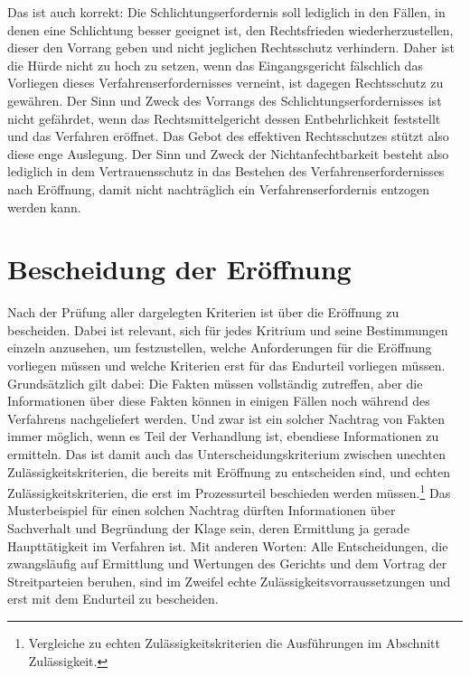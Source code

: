 Das ist auch korrekt:
Die Schlichtungserfordernis soll lediglich in den Fällen, in denen eine Schlichtung besser geeignet ist, den Rechtsfrieden wiederherzustellen, dieser den Vorrang geben und nicht jeglichen Rechtsschutz verhindern.
Daher ist die Hürde nicht zu hoch zu setzen, wenn das Eingangsgericht fälschlich das Vorliegen dieses Verfahrenserfordernisses verneint, ist dagegen Rechtsschutz zu gewähren.
Der Sinn und Zweck des Vorrangs des Schlichtungserfordernisses ist nicht gefährdet, wenn das Rechtsmittelgericht dessen Entbehrlichkeit feststellt und das Verfahren eröffnet.
Das Gebot des effektiven Rechtsschutzes stützt also diese enge Auslegung. Der Sinn und Zweck der Nichtanfechtbarkeit besteht also lediglich in dem Vertrauensschutz in das Bestehen des Verfahrenserfordernisses nach Eröffnung, damit nicht nachträglich ein Verfahrenserfordernis entzogen werden kann.

\section{Bescheidung der Eröffnung}
\label{Anrufung:Beschluss}
Nach der Prüfung aller dargelegten Kriterien ist über die Eröffnung zu bescheiden.
Dabei ist relevant, sich für jedes Kritrium und seine Bestimmungen einzeln anzusehen, um festzustellen, welche Anforderungen für die Eröffnung vorliegen müssen und welche Kriterien erst für das Endurteil vorliegen müssen.
Grundsätzlich gilt dabei:
Die Fakten müssen vollständig zutreffen, aber die Informationen über diese Fakten können in einigen Fällen noch während des Verfahrens nachgeliefert werden.
Und zwar ist ein solcher Nachtrag von Fakten immer möglich, wenn es Teil der Verhandlung ist, ebendiese Informationen zu ermitteln.
Das ist damit auch das Unterscheidungskriterium zwischen unechten Zulässigkeitskriterien, die bereits mit Eröffnung zu entscheiden sind, und echten Zulässigkeitskriterien, die erst im Prozessurteil beschieden werden müssen.\footnote{Vergleiche zu echten Zulässigkeitskriterien die Ausführungen im Abschnitt Zulässigkeit.}
Das Musterbeispiel für einen solchen Nachtrag dürften Informationen über Sachverhalt und Begründung der Klage sein, deren Ermittlung ja gerade Haupttätigkeit im Verfahren ist.
Mit anderen Worten:
Alle Entscheidungen, die zwangsläufig auf Ermittlung und Wertungen des Gerichts und dem Vortrag der Streitparteien beruhen, sind im Zweifel echte Zulässigkeitsvorraussetzungen und erst mit dem Endurteil zu bescheiden.

